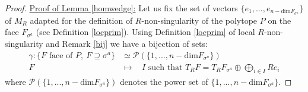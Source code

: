 \documentclass{article}
\begin{document}
\begin{proof}
    \underline{Proof of Lemma \ref{homwedge}:}
    Let us fix the set of vectors $\{e_1,...,e_{n-\mathrm{dim}F_{\sigma^a}}\}$ of $M_R$ adapted for the definition of $R$-non-singularity of the polytope $P$ on the face $F_{\sigma^a}$ (see Definition \ref{locprim}). Using Definition \ref{locprim} of local $R$-non-singularity and Remark \ref{bij} we have a bijection of sets:
    \begin{align*}
       \gamma:\{F  \text{ face of } P,~ F \supseteq \sigma^a\} &\simeq  \mathcal{P}(\{1,...,{n-\mathrm{dim}F_{\sigma^a}}\}) \\
        F ~~~~~~~~&\mapsto ~~~~I \text{ such that } T_RF=T_RF_{\sigma^a} \oplus \bigoplus_{i \in I} Re_{i}
    \end{align*}
    where $\mathcal{P}(\{1,...,{n-\mathrm{dim}F_{\sigma^a}}\})$ denotes the power set of $\{1,...,{n-\mathrm{dim}F_{\sigma^a}}\}$.
    

\end{proof}
\end{document}

